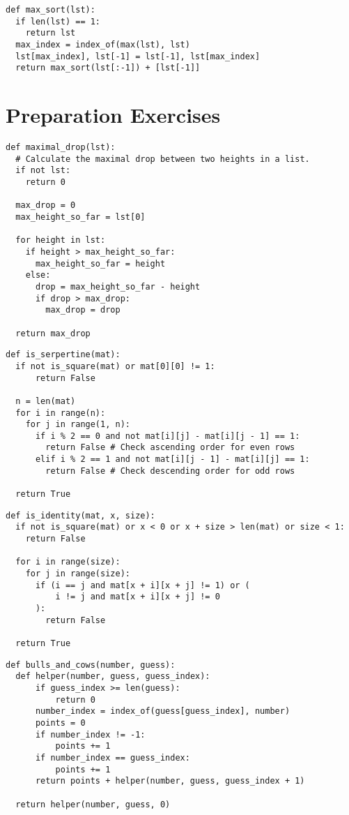 \documentclass[11pt]{article}
\begin{document}
\vspace{-0.5cm}
\begin{lstlisting}
def max_sort(lst):
  if len(lst) == 1:
    return lst
  max_index = index_of(max(lst), lst)
  lst[max_index], lst[-1] = lst[-1], lst[max_index]
  return max_sort(lst[:-1]) + [lst[-1]]
\end{lstlisting}

\pagebreak

\section{Preparation Exercises}\label{sec:preparation-exercises}
\begin{lstlisting}
def maximal_drop(lst):
  # Calculate the maximal drop between two heights in a list.
  if not lst:
    return 0

  max_drop = 0
  max_height_so_far = lst[0]

  for height in lst:
    if height > max_height_so_far:
      max_height_so_far = height
    else:
      drop = max_height_so_far - height
      if drop > max_drop:
        max_drop = drop

  return max_drop
\end{lstlisting}

\begin{lstlisting}
def is_serpertine(mat):
  if not is_square(mat) or mat[0][0] != 1:
      return False

  n = len(mat)
  for i in range(n):
    for j in range(1, n):
      if i % 2 == 0 and not mat[i][j] - mat[i][j - 1] == 1: 
        return False # Check ascending order for even rows
      elif i % 2 == 1 and not mat[i][j - 1] - mat[i][j] == 1:  
        return False # Check descending order for odd rows

  return True
\end{lstlisting}

\begin{lstlisting}
def is_identity(mat, x, size):
  if not is_square(mat) or x < 0 or x + size > len(mat) or size < 1:
    return False

  for i in range(size):
    for j in range(size):
      if (i == j and mat[x + i][x + j] != 1) or (
          i != j and mat[x + i][x + j] != 0
      ):
        return False

  return True
\end{lstlisting}

\begin{lstlisting}
def bulls_and_cows(number, guess):
  def helper(number, guess, guess_index):
      if guess_index >= len(guess):
          return 0
      number_index = index_of(guess[guess_index], number)
      points = 0
      if number_index != -1:
          points += 1
      if number_index == guess_index:
          points += 1
      return points + helper(number, guess, guess_index + 1)

  return helper(number, guess, 0)
\end{lstlisting}
\end{document}
